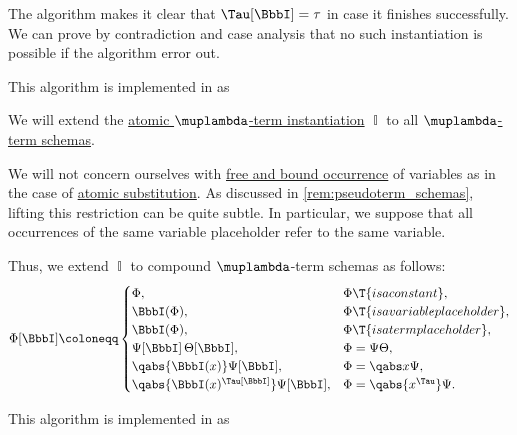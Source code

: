 \begin{defproof}
  The algorithm makes it clear that \( \Tau[\BbbI] = \tau \) in case it finishes successfully. We can prove by contradiction and case analysis that no such instantiation is possible if the algorithm error out.
\end{defproof}
\begin{comments}
  \item This algorithm is implemented in \cite{notebook:code} as
  \begin{CodeRefDisplay}
  \end{CodeRefDisplay}
\end{comments}

\begin{algorithm}\label{alg:lambda_term_schema_instantiation}
  We will extend the \hyperref[def:atomic_lambda_instantiation]{atomic \( \muplambda \)-term instantiation} \( \BbbI \) to all \hyperref[def:lambda_term_schema]{\( \muplambda \)-term schemas}.

  We will not concern ourselves with \hyperref[def:lambda_variable_occurrence]{free and bound occurrence} of variables as in the case of \hyperref[def:atomic_lambda_term_substitution]{atomic substitution}. As discussed in \cref{rem:pseudoterm_schemas}, lifting this restriction can be quite subtle. In particular, we suppose that all occurrences of the same variable placeholder refer to the same variable.

  Thus, we extend \( \BbbI \) to compound \( \muplambda \)-term schemas as follows:
  \begin{equation}\label{eq:alg:lambda_term_schema_instantiation}
    \Phi[\BbbI] \coloneqq \begin{cases}
      \Phi,                                       &\Phi \T{is a constant},             \\
      \BbbI(\Phi),                                &\Phi \T{is a variable placeholder}, \\
      \BbbI(\Phi),                                &\Phi \T{is a term placeholder},     \\
      \Psi[\BbbI] \thinspace \Theta[\BbbI],       &\Phi = \Psi\Theta,                  \\
      \qabs {\BbbI(x)} \Psi[\BbbI],               &\Phi = \qabs x \Psi,                \\
      \qabs {\BbbI(x)^{\Tau[\BbbI]}} \Psi[\BbbI], &\Phi = \qabs {x^\Tau} \Psi.
    \end{cases}
  \end{equation}
\end{algorithm}
\begin{comments}
  \item This algorithm is implemented in \cite{notebook:code} as
  \begin{CodeRefDisplay}
  \end{CodeRefDisplay}
\end{comments}

